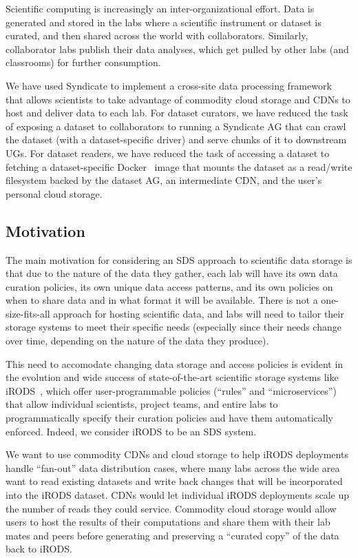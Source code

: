 Scientific computing is increasingly an inter-organizational effort.  Data is
generated and stored in the labs where a scientific instrument or dataset is
curated, and then shared across the world with collaborators.  Similarly,
collaborator labs publish their data analyses, which get pulled by other labs
(and classrooms) for further consumption.

We have used Syndicate to implement a cross-site data processing framework that
allows scientists to take advantage of commodity cloud storage and CDNs to host
and deliver data to each lab.  For dataset curators, we have reduced the task of
exposing a dataset to collaborators to running a Syndicate AG that can crawl the
dataset (with a dataset-specific driver) and serve chunks of it to downstream
UGs.  For dataset readers, we have reduced the task of accessing a dataset to
fetching a dataset-specific Docker~\cite{docker} image that mounts the dataset
as a read/write filesystem backed by the dataset AG, an intermediate CDN, and
the user's personal cloud storage.

\subsection{Motivation}

The main motivation for considering an SDS approach to scientific data storage is
that due to the nature of the data they gather, each lab will have its own data curation
policies, its own unique data access patterns, and its own policies on when to
share data and in what format it will be available.  There is not a
one-size-fits-all approach for hosting scientific data, and labs will need to tailor
their storage systems to meet their specific needs (especially since their needs
change over time, depending on the nature of the data they produce).

This need to accomodate changing data storage and access policies is evident in
the evolution and wide success of state-of-the-art scientific storage systems
like iRODS~\cite{irods}, which offer
user-programmable policies (``rules'' and ``microservices'') that allow
individual scientists, project teams, and entire labs to programmatically
specify their curation policies and have them automatically enforced.
Indeed, we consider iRODS to be an SDS system.

We want to use commodity CDNs and cloud storage to help iRODS deployments
handle ``fan-out'' data distribution cases, where many labs across the wide
area want to read existing datasets and write back changes that will be
incorporated into the iRODS dataset.  CDNs would let individual iRODS
deployments scale up the number of reads they could service.  Commodity cloud
storage would allow users to host the results of their computations and share
them with their lab mates and peers before generating and preserving a
``curated copy'' of the data back to iRODS.

